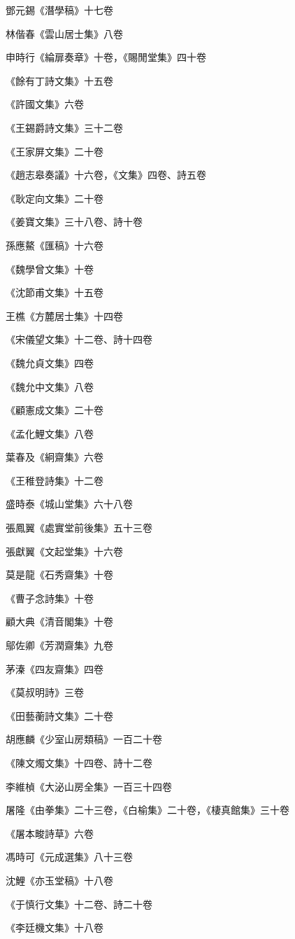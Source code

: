 鄧元錫《潛學稿》十七卷

林偕春《雲山居士集》八卷

申時行《綸扉奏章》十卷，《賜閒堂集》四十卷

《餘有丁詩文集》十五卷

《許國文集》六卷

《王錫爵詩文集》三十二卷

《王家屏文集》二十卷

《趙志皋奏議》十六卷，《文集》四卷、詩五卷

《耿定向文集》二十卷

《姜寶文集》三十八卷、詩十卷

孫應鰲《匯稿》十六卷

《魏學曾文集》十卷

《沈節甫文集》十五卷

王樵《方麓居士集》十四卷

《宋儀望文集》十二卷、詩十四卷

《魏允貞文集》四卷

《魏允中文集》八卷

《顧憲成文集》二十卷

《孟化鯉文集》八卷

葉春及《絅齋集》六卷

《王稚登詩集》十二卷

盛時泰《城山堂集》六十八卷

張鳳翼《處實堂前後集》五十三卷

張獻翼《文起堂集》十六卷

莫是龍《石秀齋集》十卷

《曹子念詩集》十卷

顧大典《清音閣集》十卷

鄔佐卿《芳潤齋集》九卷

茅溱《四友齋集》四卷

《莫叔明詩》三卷

《田藝蘅詩文集》二十卷

胡應麟《少室山房類稿》一百二十卷

《陳文燭文集》十四卷、詩十二卷

李維楨《大泌山房全集》一百三十四卷

屠隆《由拳集》二十三卷，《白榆集》二十卷，《棲真館集》三十卷

《屠本畯詩草》六卷

馮時可《元成選集》八十三卷

沈鯉《亦玉堂稿》十八卷

《于慎行文集》十二卷、詩二十卷

《李廷機文集》十八卷

